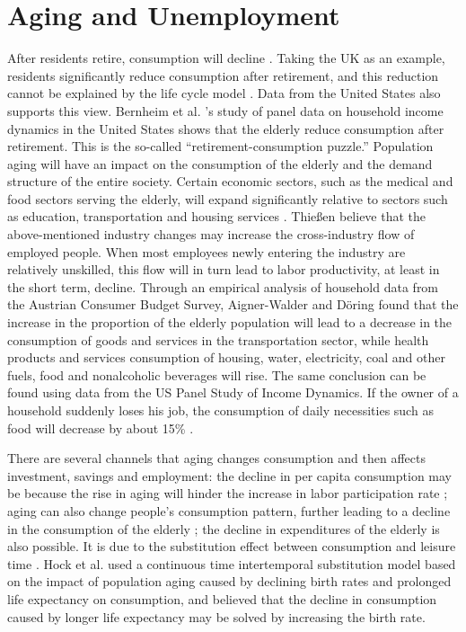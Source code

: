 \documentclass[ %
    final,
    scrbook,
    listoffigures,
    listoftables, 
    glossary]{cu-thesis}
\begin{document}
\section{Aging and Unemployment}
After residents retire, consumption will decline \cite{hamermesh1980unemployment}. Taking the UK as an example, residents significantly reduce consumption after retirement, and this reduction cannot be explained by the life cycle model \cite{banks2006retirement}. Data from the United States also supports this view. Bernheim et al. \cite{bernheim2001accounts} ’s study of panel data on household income dynamics in the United States shows that the elderly reduce consumption after retirement. This is the so-called “retirement-consumption puzzle.” Population aging will have an impact on the consumption of the elderly and the demand structure of the entire society. Certain economic sectors, such as the medical and food sectors serving the elderly, will expand significantly relative to sectors such as education, transportation and housing services \cite{hagemann1989population}. Thießen \cite{thiessen2007aging} believe that the above-mentioned industry changes may increase the cross-industry flow of employed people. When most employees newly entering the industry are relatively unskilled, this flow will in turn lead to labor productivity, at least in the short term, decline. Through an empirical analysis of household data from the Austrian Consumer Budget Survey, Aigner-Walder and D\"{o}ring \cite{aigner2012effects} found that the increase in the proportion of the elderly population will lead to a decrease in the consumption of goods and services in the transportation sector, while health products and services consumption of housing, water, electricity, coal and other fuels, food and nonalcoholic beverages will rise. The same conclusion can be found using data from the US Panel Study of Income Dynamics. If the owner of a household suddenly loses his job, the consumption of daily necessities such as food will decrease by about 15\% \cite{stephens2002worker}. 

There are several channels that aging changes consumption and then affects investment, savings and employment: the decline in per capita consumption may be because the rise in aging will hinder the increase in labor participation rate \cite{sheiner2007primer}; aging can also change people’s consumption pattern, further leading to a decline in the consumption of the elderly \cite{banks2006retirement}; the decline in expenditures of the elderly is also possible. It is due to the substitution effect between consumption and leisure time \cite{hurd2003retirement}. Hock et al. \cite{hock2012dynamics} used a
continuous time intertemporal substitution model based on the impact of population aging caused by declining birth rates and prolonged life expectancy on consumption, and believed that the decline in consumption caused by longer life expectancy may be solved by increasing the birth rate.
\end{document}
